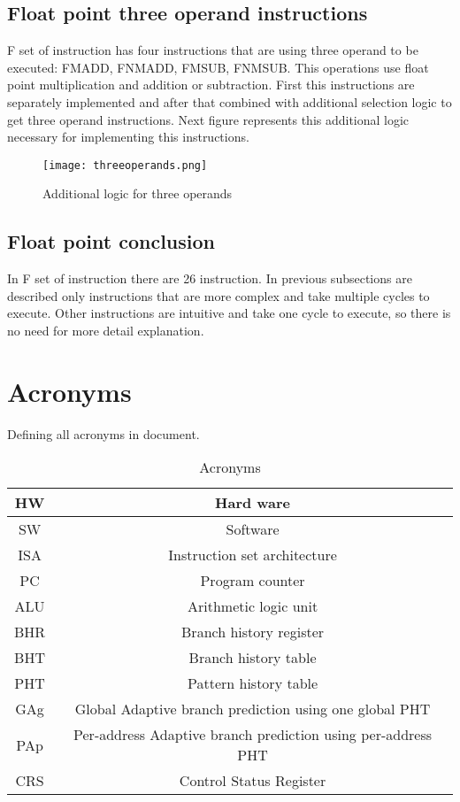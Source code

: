 \documentclass{scrreprt}
\begin{document}
\subsection*{Float point three operand instructions}
F set of instruction has four instructions that are using three operand to be executed: FMADD, FNMADD, FMSUB, FNMSUB. This operations use float point multiplication and addition or subtraction. First this instructions are separately implemented and after that combined with additional selection logic to get three operand instructions. Next figure represents this additional logic necessary for implementing this instructions. 
\begin{figure}
    \centering
    \texttt{[image: threeoperands.png]}
    \caption{Additional logic for three operands}
    \label{fig:ThreeOp}
\end{figure}

\subsection*{Float point conclusion}
In F set of instruction there are 26 instruction. In previous subsections are described only instructions that are more complex and take multiple cycles to execute. Other instructions are intuitive and take one cycle to execute, so there is no need for more detail explanation. 

\newpage
{} 
\section*{Acronyms}
    Defining all acronyms in document. 
    \begin{table}[ht]
        \centering
        \begin{tabular}{|c|c|} \hline 
            HW & Hard ware\\ \hline 
            SW & Software\\ \hline 
            ISA & Instruction set architecture\\ \hline 
            PC & Program counter\\ \hline 
            ALU & Arithmetic logic unit\\ \hline 
            BHR & Branch history register\\ \hline
            BHT & Branch history table\\ \hline
            PHT & Pattern history table\\ \hline
            GAg & Global Adaptive branch prediction using one global PHT\\ \hline
            PAp & Per-address Adaptive branch prediction using per-address PHT\\ \hline
            CRS & Control Status Register \\ \hline
        \end{tabular}
        \caption{Acronyms}
        \label{tab:table4}
    \end{table}
\end{document}
